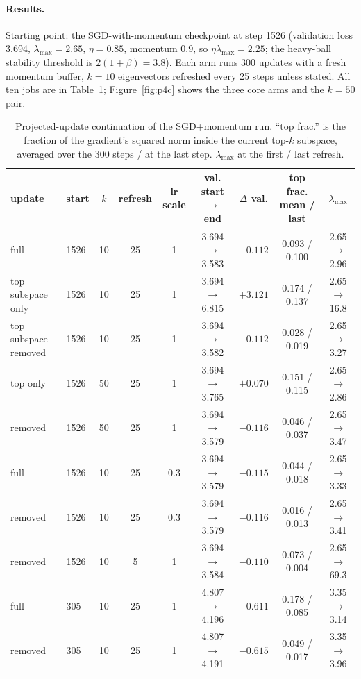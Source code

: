 \documentclass[10pt,letterpaper]{article}
\newcommand{\lmax}{\lambda_{\max}}
\begin{document}
\paragraph{Results.} Starting point: the SGD-with-momentum checkpoint at step 1526 (validation loss 3.694, $\lmax=2.65$, $\eta=0.85$, momentum 0.9, so $\eta\lmax=2.25$; the heavy-ball stability threshold is $2(1+\beta)=3.8$). Each arm runs 300 updates with a fresh momentum buffer, $k=10$ eigenvectors refreshed every 25 steps unless stated. All ten jobs are in Table~\ref{tab:p4c}; Figure~\ref{fig:p4c} shows the three core arms and the $k=50$ pair.

\begin{table}[h]\centering\caption{Projected-update continuation of the SGD+momentum run. ``top frac.'' is the fraction of the gradient's squared norm inside the current top-$k$ subspace, averaged over the 300 steps / at the last step. $\lmax$ at the first / last refresh.}
\label{tab:p4c}
\small\begin{tabular}{llccccccc}\toprule
update & start & $k$ & refresh & lr scale & val. start $\to$ end & $\Delta$ val. & top frac. mean / last & $\lmax$\\
\midrule
full & 1526 & 10 & 25 & 1 & 3.694 $\to$ 3.583 & $-0.112$ & 0.093 / 0.100 & 2.65 $\to$ 2.96\\
top subspace only & 1526 & 10 & 25 & 1 & 3.694 $\to$ 6.815 & $+3.121$ & 0.174 / 0.137 & 2.65 $\to$ 16.8\\
top subspace removed & 1526 & 10 & 25 & 1 & 3.694 $\to$ 3.582 & $-0.112$ & 0.028 / 0.019 & 2.65 $\to$ 3.27\\
top only & 1526 & 50 & 25 & 1 & 3.694 $\to$ 3.765 & $+0.070$ & 0.151 / 0.115 & 2.65 $\to$ 2.86\\
removed & 1526 & 50 & 25 & 1 & 3.694 $\to$ 3.579 & $-0.116$ & 0.046 / 0.037 & 2.65 $\to$ 3.47\\
full & 1526 & 10 & 25 & 0.3 & 3.694 $\to$ 3.579 & $-0.115$ & 0.044 / 0.018 & 2.65 $\to$ 3.33\\
removed & 1526 & 10 & 25 & 0.3 & 3.694 $\to$ 3.579 & $-0.116$ & 0.016 / 0.013 & 2.65 $\to$ 3.41\\
removed & 1526 & 10 & 5 & 1 & 3.694 $\to$ 3.584 & $-0.110$ & 0.073 / 0.004 & 2.65 $\to$ 69.3\\
full & 305 & 10 & 25 & 1 & 4.807 $\to$ 4.196 & $-0.611$ & 0.178 / 0.085 & 3.35 $\to$ 3.14\\
removed & 305 & 10 & 25 & 1 & 4.807 $\to$ 4.191 & $-0.615$ & 0.049 / 0.017 & 3.35 $\to$ 3.96\\
\bottomrule\end{tabular}\end{table}
\end{document}
